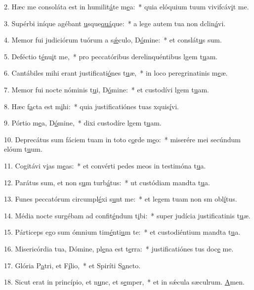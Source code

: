 2. Hæc me consoláta est in humilit\uline{á}te m\uline{e}a:~* quia elóquium tuum vivifcáv\uline{i}t me.\par 
3. Supérbi iníque agébant \uline{u}sque\uline{quá}que:~* a lege autem tua non dclin\uline{á}vi.\par 
4. Memor fui judiciórum tuórum a s\uline{ǽ}culo, D\uline{ó}mine:~* et conslát\uline{u}s sum.\par 
5. Deféctio t\uline{é}nu\uline{i}t me,~* pro peccatóribus derelinquéntibus lgem t\uline{u}am.\par 
6. Cantábiles mihi erant justificati\uline{ó}nes t\uline{u}æ,~* in loco peregrinatinis m\uline{e}æ.\par 
7. Memor fui nocte nóminis t\uline{u}i, D\uline{ó}mine:~* et custodívi lgem t\uline{u}am.\par 
8. Hæc f\uline{a}cta est m\uline{i}hi:~* quia justificatiónes tuas xquis\uline{í}vi.\par 
9. Pórtio m\uline{e}a, D\uline{ó}mine,~* dixi custodíre lgem t\uline{u}am.\par 
10. Deprecátus sum fáciem tuam in toto c\uline{o}rde m\uline{e}o:~* miserére mei secúndum elóum t\uline{u}um.\par 
11. Cogitávi v\uline{i}as m\uline{e}as:~* et convérti pedes meos in testimóna t\uline{u}a.\par 
12. Parátus sum, et non s\uline{u}m turb\uline{á}tus:~* ut custódiam mandta t\uline{u}a.\par 
13. Funes peccatórum circumpl\uline{é}xi s\uline{u}nt me:~* et legem tuam non sm obl\uline{í}tus.\par 
14. Média nocte surgébam ad confit\uline{é}ndum t\uline{i}bi:~* super judícia justificatinis t\uline{u}æ.\par 
15. Párticeps ego sum ómnium tim\uline{é}nti\uline{u}m te:~* et custodiéntium mandta t\uline{u}a.\par 
16. Misericórdia tua, Dómine, pl\uline{e}na est t\uline{e}rra:~* justificatiónes tus doc\uline{e} me.\par 
17. Glória P\uline{a}tri, et F\uline{í}lio,~* et Spiríti S\uline{a}ncto.\par 
18. Sicut erat in princípio, et n\uline{u}nc, et s\uline{e}mper,~* et in sǽcula sæculrum. \uline{A}men.\par 
